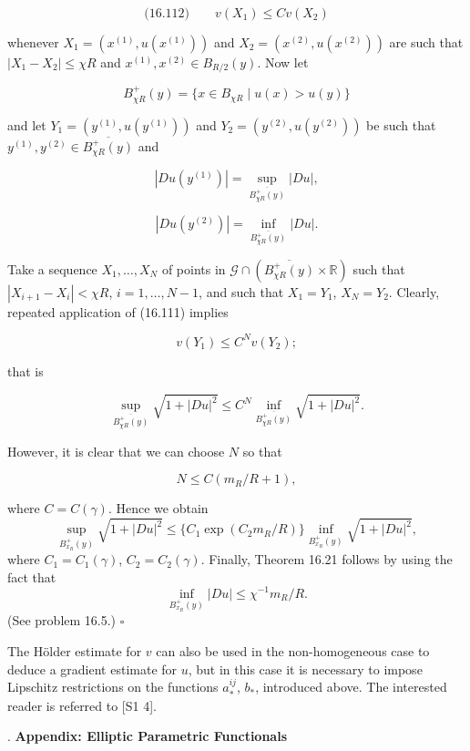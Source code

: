 \[
\text{(16.112)} \qquad v(X_1)\leq Cv(X_2)
\]

whenever $X_1=(x^{(1)},u(x^{(1)}))$ and $X_2=(x^{(2)},u(x^{(2)}))$ are such that $|X_1-X_2|\leq \chi R$
and $x^{(1)}, x^{(2)}\in B_{R/2}(y)$. Now let

\[
B_{\chi R}^{+}(y)=\{x\in B_{\chi R}\mid u(x)>u(y)\}
\]

and let $Y_1=(y^{(1)},u(y^{(1)}))$ and $Y_2=(y^{(2)},u(y^{(2)}))$ be such that $y^{(1)}, y^{(2)}\in \overline{B_{\chi R}^{+}(y)}$
and

\[
|Du(y^{(1)})|=\sup_{\overline{B_{\chi R}^{+}(y)}} |Du|,
\]

\[
|Du(y^{(2)})|=\inf_{\overline{B_{\chi R}^{+}(y)}} |Du|.
\]

Take a sequence $X_1,\ldots,X_N$ of points in $\mathcal{G}\cap (\overline{B_{\chi R}^{+}(y)}\times \mathbb{R})$ such that
$|X_{i+1}-X_i|<\chi R$, $i=1,\ldots,N-1$, and such that $X_1=Y_1$, $X_N=Y_2$. Clearly, repeated application
of (16.111) implies

\[
v(Y_1)\leq C^N v(Y_2);
\]

that is

\[
\sup_{\overline{B_{\chi R}^{+}(y)}} \sqrt{1+|Du|^2}\leq C^N \inf_{\overline{B_{\chi R}^{+}(y)}} \sqrt{1+|Du|^2}.
\]

However, it is clear that we can choose $N$ so that

\[
N\leq C(m_R/R+1),
\]


where $C=C(\gamma)$. Hence we obtain
\[
\sup_{B^+_{x_R}(y)} \sqrt{1+|Du|^2}\leq \{C_1 \exp(C_2 m_R/R)\} \inf_{B^+_{x_R}(y)} \sqrt{1+|Du|^2},
\]
where $C_1=C_1(\gamma)$, $C_2=C_2(\gamma)$. Finally, Theorem 16.21 follows by using the fact that
\[
\inf_{B^+_{x_R}(y)} |Du|\leq \chi^{-1} m_R/R.
\]
(See problem 16.5.) $\square$

The H\"older estimate for $v$ can also be used in the non-homogeneous case to deduce a gradient estimate for $u$, but in this case it is necessary to impose Lipschitz restrictions on the functions $a_*^{ij}$, $b_*$, introduced above. The interested reader is referred to [S1 4].

\bigskip

. \textbf{Appendix: Elliptic Parametric Functionals}


